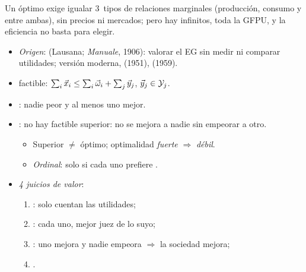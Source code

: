 \documentclass{article}
\begin{document}
\begin{columnas}
\begin{ideaclave}
Un óptimo exige igualar 3~tipos de relaciones marginales (producción, consumo y entre ambas), sin precios ni mercados; pero hay infinitos, toda la GFPU, y la eficiencia no basta para elegir.
\end{ideaclave}

\begin{itemize}
\item \emph{Origen}:  (Lausana; \emph{Manuale}, 1906): valorar el EG sin medir ni comparar utilidades; versión moderna,  (1951),  (1959).
\item {} factible: $\sum_i\vec{x}_i\leq\sum_i\vec{\omega}_i+\sum_j\vec{y}_j$, $\vec{y}_j\in\mathcal{Y}_j$.
\item {}: nadie peor y al menos uno mejor.
\item {}: no hay factible  superior: no se mejora a nadie sin empeorar a otro.
  \begin{itemize}
  \item Superior $\neq$ óptimo; optimalidad \emph{fuerte} $\Rightarrow$ \emph{débil}.
  \item \emph{Ordinal}: solo si cada uno prefiere .
  \end{itemize}
\item \emph{4 juicios de valor}:
  \begin{enumerate}
  \item {}: solo cuentan las utilidades;
  \item {}: cada uno, mejor juez de lo suyo;
  \item {}: uno mejora y nadie empeora $\Rightarrow$ la sociedad mejora;
  \item {}.
  \end{enumerate}
\end{itemize}


\end{columnas}
\end{document}

